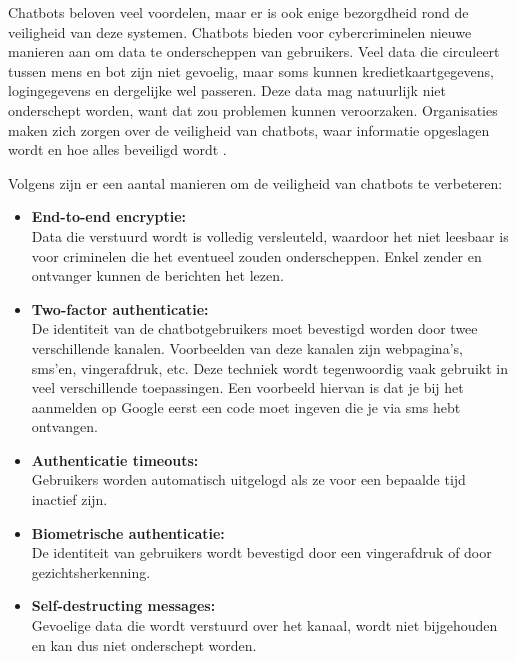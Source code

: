 Chatbots beloven veel voordelen, maar er is ook enige bezorgdheid rond de veiligheid van deze systemen. Chatbots bieden voor cybercriminelen nieuwe manieren aan om data te onderscheppen van gebruikers. Veel data die circuleert tussen mens en bot zijn niet gevoelig, maar soms kunnen kredietkaartgegevens, logingegevens en dergelijke wel passeren. Deze data mag natuurlijk niet onderschept worden, want dat zou problemen kunnen veroorzaken. Organisaties maken zich zorgen over de veiligheid van chatbots, waar informatie opgeslagen wordt en hoe alles beveiligd wordt \autocite{Shanbhag2018}.


Volgens \textcite{Shanbhag2018} zijn er een aantal manieren om de veiligheid van chatbots te verbeteren:

\begin{itemize}
    \item \textbf{End-to-end encryptie:} \\
    
    Data die verstuurd wordt is volledig versleuteld, waardoor het niet leesbaar is voor criminelen die het eventueel zouden onderscheppen. Enkel zender en ontvanger kunnen de berichten het lezen. \\
    
    \item \textbf{Two-factor authenticatie:} \\
    
    De identiteit van de chatbotgebruikers moet bevestigd worden door twee verschillende kanalen. Voorbeelden van deze kanalen zijn webpagina’s, sms’en, vingerafdruk, etc. Deze techniek wordt tegenwoordig vaak gebruikt in veel verschillende toepassingen. Een voorbeeld hiervan is dat je bij het aanmelden op Google eerst een code moet ingeven die je via sms hebt ontvangen. \\
    
    \item \textbf{Authenticatie timeouts:} \\
    
    Gebruikers worden automatisch uitgelogd als ze voor een bepaalde tijd inactief zijn. \\
    
    \item \textbf{Biometrische authenticatie:} \\
    
    De identiteit van gebruikers wordt bevestigd door een vingerafdruk of door gezichtsherkenning. \\
    
    \item \textbf{Self-destructing messages:} \\
    
    Gevoelige data die wordt verstuurd over het kanaal, wordt niet bijgehouden en kan dus niet onderschept worden. \\
\end{itemize}

